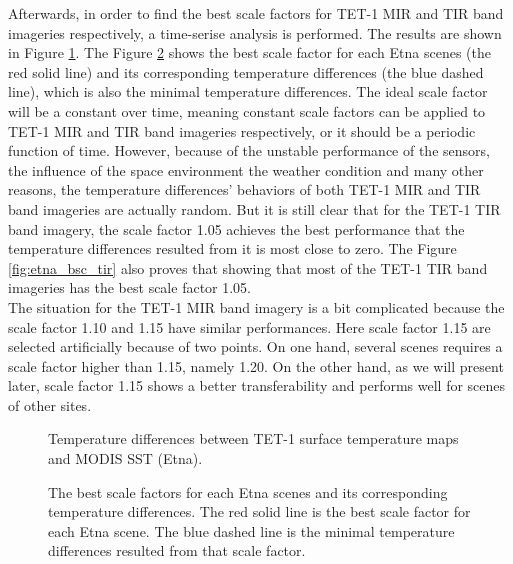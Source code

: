 \noindent Afterwards, in order to find the best scale factors for TET-1 MIR and TIR band imageries respectively, a time-serise analysis is performed. The results are shown in Figure \ref{fig:etna_sc_mir_tir}. The Figure \ref{fig:etna_bsc_tem} shows the best scale factor for each Etna scenes (the red solid line) and its corresponding temperature differences (the blue dashed line), which is also the minimal temperature differences. The ideal scale factor will be a constant over time, meaning constant scale factors can be applied to TET-1 MIR and TIR band imageries respectively, or it should be a periodic function of time. However, because of the unstable performance of the sensors, the influence of the space environment the weather condition and many other reasons, the temperature differences' behaviors of both TET-1 MIR and TIR band imageries are actually random. But it is still clear that for the TET-1 TIR band imagery, the scale factor 1.05 achieves the best performance that the temperature differences resulted from it is most close to zero. The Figure \ref{fig:etna_bsc_tir} also proves that showing that most of the TET-1 TIR band imageries has the best scale factor 1.05.\\

\noindent The situation for the TET-1 MIR band imagery is a bit complicated because the scale factor 1.10 and 1.15 have similar performances. Here scale factor 1.15 are selected artificially because of two points. On one hand, several scenes requires a scale factor higher than 1.15, namely 1.20. On the other hand, as we will present later, scale factor 1.15 shows a better transferability and performs well for scenes of other sites.\\

\begin{figure}[!htbp]
\centering
{}
\hspace{0.5in}
\caption{Temperature differences between TET-1 surface temperature maps and MODIS SST (Etna).}
\label{fig:etna_sc_mir_tir}
\end{figure}

\begin{figure}[!htbp]
\centering
{}
\hspace{0.5in}
\caption{The best scale factors for each Etna scenes and its corresponding temperature differences. The red solid line is the best scale factor for each Etna scene. The blue dashed line is the minimal temperature differences resulted from that scale factor.}
\label{fig:etna_bsc_tem}
\end{figure}

